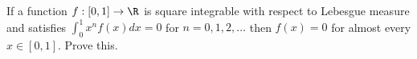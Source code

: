 If a function $f:[0,1]\rightarrow \R$ is square integrable with
respect to Lebesgue measure and satisfies $\int_0^1x^nf(x)dx=0$ for
$n=0,1,2,\ldots $ then $f(x)=0$ for almost every $x\in [0,1]$. Prove 
this.
